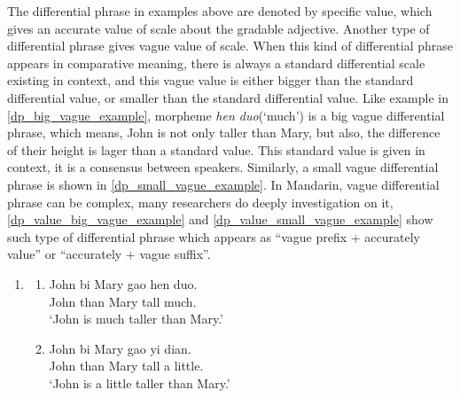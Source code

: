 \documentclass{ctexart}
\let \cite \parencite
\begin{document}
The differential phrase in examples above are denoted by specific value, which gives an accurate value of scale about the gradable adjective. Another type of differential phrase gives vague value of scale. When this kind of differential phrase appears in comparative meaning, there is always a standard differential scale existing in context, and this vague value is either bigger than the standard differential value, or smaller than the standard differential value. Like example in \ref{dp_big_vague_example}, morpheme \textit{hen duo}(`much') is a big vague differential phrase, which means, John is not only taller than Mary, but also, the difference of their height is lager than a standard value. This standard value is given in context, it is a consensus between speakers. Similarly, a small vague differential phrase is shown in \ref{dp_small_vague_example}. In Mandarin, vague differential phrase can be complex, many researchers \cite{lin2014,li2015} do deeply investigation on it, \ref{dp_value_big_vague_example} and \ref{dp_value_small_vague_example} show such type of differential phrase which appears as ``vague prefix + accurately value'' or ``accurately + vague suffix''.

\begin{enumerate}
    \item
    \begin{enumerate}
        \item \label{dp_big_vague_example}
        John \enspace bi \enspace Mary \enspace gao \enspace hen duo.\\
        John than Mary \enspace tall \enspace \enspace much. \\
        `John is much taller than Mary.'

        \item \label{dp_small_vague_example}
        John \enspace bi \enspace Mary \enspace gao \enspace yi dian.\\
        John than Mary \enspace tall \enspace a little.\\
        `John is a little taller than Mary.'

    \end{enumerate}
\end{enumerate}
\end{document}
